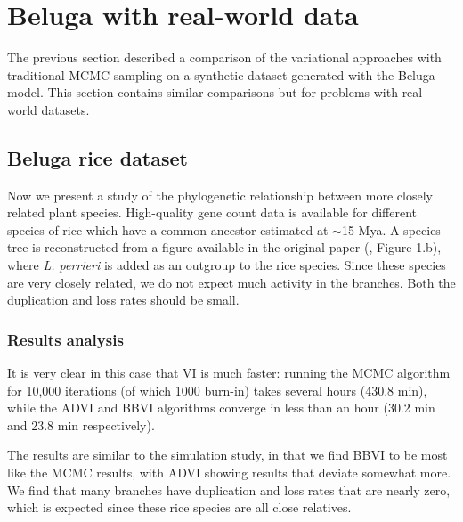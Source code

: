 \section{Beluga with real-world data}

\par The previous section described a comparison of the variational approaches with traditional MCMC sampling on a synthetic dataset generated with the Beluga model. This section contains similar comparisons but for problems with real-world datasets. 


\subsection{Beluga rice dataset}

\par Now we present a study of the phylogenetic relationship between more closely related plant species. High-quality gene count data is available for different species of rice which have a common ancestor estimated at $\sim$15 Mya. A species tree is reconstructed from a figure available in the original paper (\cite{rice}, Figure 1.b), where \textit{L. perrieri} is added as an outgroup to the rice species. Since these species are very closely related, we do not expect much activity in the branches. Both the duplication and loss rates should be small.

\subsubsection{Results analysis}
It is very clear in this case that VI is much faster: running the MCMC algorithm for 10,000 iterations (of which 1000 burn-in) takes several hours (430.8 min), while the ADVI and BBVI algorithms converge in less than an hour (30.2 min and 23.8 min respectively).
\medskip
\par The results are similar to the simulation study, in that we find BBVI to be most like the MCMC results, with ADVI showing results that deviate somewhat more. We find that many branches have duplication and loss rates that are nearly zero, which is expected since these rice species are all close relatives.

